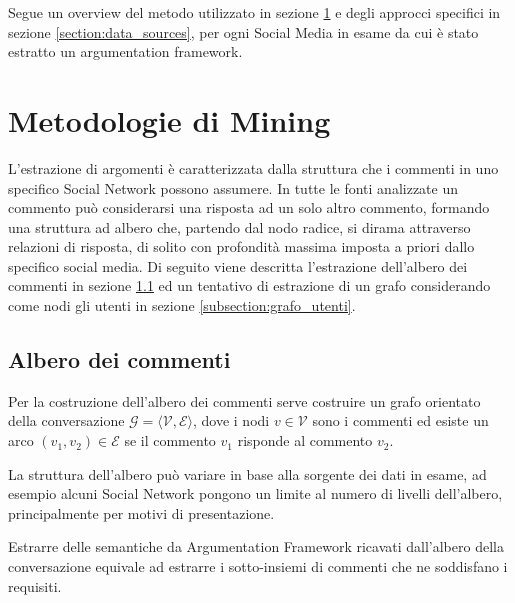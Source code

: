 



Segue un overview del metodo utilizzato in sezione \ref{section:approcci} e degli approcci specifici in sezione \ref{section:data_sources}, per ogni Social Media in esame da cui è stato estratto un argumentation framework.

\section{Metodologie di Mining}
\label{section:approcci}
L'estrazione di argomenti è caratterizzata dalla struttura che i commenti in uno specifico Social Network possono assumere. In tutte le fonti analizzate un commento può considerarsi una risposta ad un solo altro commento, formando una struttura ad albero che, partendo dal nodo radice, si dirama attraverso relazioni di risposta, di solito con profondità massima imposta a priori dallo specifico social media. Di seguito viene descritta l'estrazione dell'albero dei commenti in sezione \ref{subsection:albero_commenti} ed un tentativo di estrazione di un grafo considerando come nodi gli utenti in sezione \ref{subsection:grafo_utenti}.

\subsection{Albero dei commenti}
\label{subsection:albero_commenti}
Per la costruzione dell'albero dei commenti serve costruire un grafo orientato della conversazione $\mathcal{G = ⟨V, E⟩}$, dove i nodi $v \in \mathcal{V}$ sono i commenti ed esiste un arco $(v_1,v_2) \in \mathcal{E}$ se il commento $v_1$ risponde al commento $v_2$.

La struttura dell'albero può variare in base alla sorgente dei dati in esame, ad esempio alcuni Social Network pongono un limite al numero di livelli dell'albero, principalmente per motivi di presentazione.

Estrarre delle semantiche da Argumentation Framework ricavati dall'albero della conversazione equivale ad estrarre i sotto-insiemi di commenti che ne soddisfano i requisiti.


